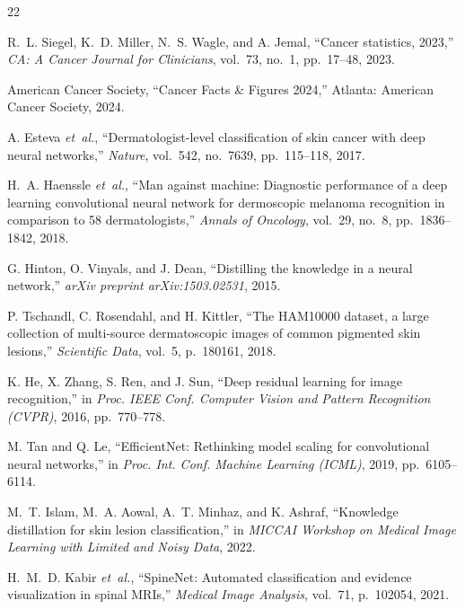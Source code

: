 \documentclass[conference]{IEEEtran}
\begin{document}

\begin{thebibliography}{22}

R.~L. Siegel, K.~D. Miller, N.~S. Wagle, and A. Jemal, ``Cancer statistics, 2023,'' \emph{CA: A Cancer Journal for Clinicians}, vol.~73, no.~1, pp.~17--48, 2023.

American Cancer Society, ``Cancer Facts \& Figures 2024,'' Atlanta: American Cancer Society, 2024.

A. Esteva \emph{et~al.}, ``Dermatologist-level classification of skin cancer with deep neural networks,'' \emph{Nature}, vol.~542, no.~7639, pp.~115--118, 2017.

H.~A. Haenssle \emph{et~al.}, ``Man against machine: Diagnostic performance of a deep learning convolutional neural network for dermoscopic melanoma recognition in comparison to 58 dermatologists,'' \emph{Annals of Oncology}, vol.~29, no.~8, pp.~1836--1842, 2018.

G. Hinton, O. Vinyals, and J. Dean, ``Distilling the knowledge in a neural network,'' \emph{arXiv preprint arXiv:1503.02531}, 2015.

P. Tschandl, C. Rosendahl, and H. Kittler, ``The HAM10000 dataset, a large collection of multi-source dermatoscopic images of common pigmented skin lesions,'' \emph{Scientific Data}, vol.~5, p.~180161, 2018.

K. He, X. Zhang, S. Ren, and J. Sun, ``Deep residual learning for image recognition,'' in \emph{Proc. IEEE Conf. Computer Vision and Pattern Recognition (CVPR)}, 2016, pp.~770--778.

M. Tan and Q. Le, ``EfficientNet: Rethinking model scaling for convolutional neural networks,'' in \emph{Proc. Int. Conf. Machine Learning (ICML)}, 2019, pp.~6105--6114.

M.~T. Islam, M.~A. Aowal, A.~T. Minhaz, and K. Ashraf, ``Knowledge distillation for skin lesion classification,'' in \emph{MICCAI Workshop on Medical Image Learning with Limited and Noisy Data}, 2022.

H.~M.~D. Kabir \emph{et~al.}, ``SpineNet: Automated classification and evidence visualization in spinal MRIs,'' \emph{Medical Image Analysis}, vol.~71, p.~102054, 2021.


\end{thebibliography}
\end{document}
